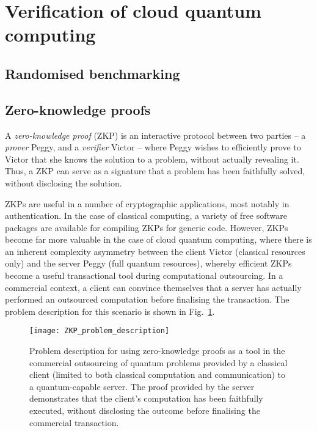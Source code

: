 %
%

\section{Verification of cloud quantum computing} \label{sec:verification}

\subsection{Randomised benchmarking}\label{sec:rand_bench}


\subsection{Zero-knowledge proofs}\label{sec:ZKP}




A \textit{zero-knowledge proof} (ZKP) is an interactive protocol between two parties -- a \textit{prover} Peggy, and a \textit{verifier} Victor -- where Peggy wishes to efficiently prove to Victor that she knows the solution to a problem, without actually revealing it. Thus, a ZKP can serve as a signature that a problem has been faithfully solved, without disclosing the solution.

ZKPs are useful in a number of cryptographic applications, most notably in authentication. In the case of classical computing, a variety of free software packages are available for compiling ZKPs for generic code. However, ZKPs become far more valuable in the case of cloud quantum computing, where there is an inherent complexity asymmetry between the client Victor (classical resources only) and the server Peggy (full quantum resources), whereby efficient ZKPs become a useful transactional tool during computational outsourcing. In a commercial context, a client can convince themselves that a server has actually performed an outsourced computation before finalising the transaction. The problem description for this scenario is shown in Fig.~\ref{fig:ZKP_problem_description}.

\begin{figure}[!htbp]
	\texttt{[image: ZKP\_problem\_description]}	
	\captionspacefig \caption{Problem description for using zero-knowledge proofs as a tool in the commercial outsourcing of quantum problems provided by a classical client (limited to both classical computation and communication) to a quantum-capable server. The proof provided by the server demonstrates that the client's computation has been faithfully executed, without disclosing the outcome before finalising the commercial transaction.}\label{fig:ZKP_problem_description}
\end{figure}

